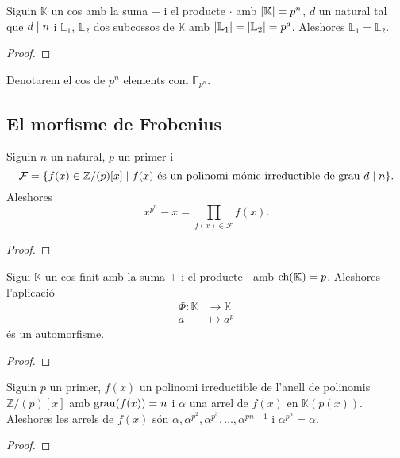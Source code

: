 \documentclass[../Apunts.tex]{subfiles}
\begin{document}
	\begin{theorem}
		Siguin \(\mathbb{K}\) un cos amb la suma \(+\) i el producte \(\cdot\) amb \(\abs{\mathbb{K}}=p^{n}\), \(d\) un natural tal que \(d\mathrel{|} n\) i \(\mathbb{L}_{1}\), \(\mathbb{L}_{2}\) dos subcossos de \(\mathbb{K}\) amb \(\abs{\mathbb{L}_{1}}=\abs{\mathbb{L}_{2}}=p^{d}\). Aleshores \(\mathbb{L}_{1}=\mathbb{L}_{2}\).
		\begin{proof}
		\end{proof}
	\end{theorem}
	\begin{notation}
		Denotarem el cos de \(p^{n}\) elements com \(\mathbb{F}_{p^{n}}\).
	\end{notation}
	\subsection{El morfisme de Frobenius}	%
	\begin{theorem}
		Siguin \(n\) un natural, \(p\) un primer i
		\[\mathcal{F}=\{f(x)\in\mathbb{Z}/(p)[x]\mid f(x)\text{ és un polinomi mónic irreductible de grau }d\mathrel{|} n\}.\]
		Aleshores
		\[x^{p^{n}}-x=\prod_{f(x)\in\mathcal{F}}f(x).\]
		\begin{proof}
		\end{proof}
	\end{theorem}
	\begin{proposition}
		Sigui \(\mathbb{K}\) un cos finit amb la suma \(+\) i el producte \(\cdot\) amb \(\operatorname{ch}(\mathbb{K})=p\). Aleshores l'aplicació
		\begin{align*}
		\Phi\colon\mathbb{K}&\longrightarrow\mathbb{K}\\
		a&\longmapsto a^{p}
		\end{align*}
		és un automorfisme.
		\begin{proof}
		\end{proof}
	\end{proposition}
	\begin{theorem}
		Siguin \(p\) un primer, \(f(x)\) un polinomi irreductible de l'anell de polinomis \(\mathbb{Z}/(p)[x]\) amb \(\operatorname{grau}(f(x))=n\) i \(\alpha\) una arrel de \(f(x)\) en \(\mathbb{K}(p(x))\). Aleshores les arrels de \(f(x)\) són \(\alpha,\alpha^{p^{2}},\alpha^{p^{3}},\dots,\alpha^{p{n-1}}\) i \(\alpha^{p^{n}}=\alpha\).
		\begin{proof}
		\end{proof}
	\end{theorem}
\end{document}
